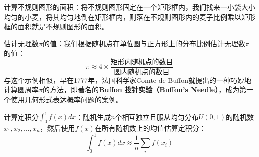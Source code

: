 \begin{example}
计算不规则图形的面积：将不规则图形固定在一个矩形框内，我们找来一小袋大小均匀的小麦，将其均匀地倒在矩形框内，则落在不规则图形内的麦子比例乘以矩形框的面积就是不规则图形的面积。
\end{example}
\begin{example}
估计无理数$\pi$的值：我们根据随机点在单位圆与正方形上的分布比例估计无理数$\pi$的值：
\[
   \pi \approx 4\times \frac{\texttt{矩形内随机点的数目}}{\texttt{圆内随机点的数目}}
\]
与这个示例相似，早在1777年，法国科学家Comte de Buffon就提出的一种巧妙地计算圆周率$\pi$的方法，即著名的\textbf{Buffon 投针实验（Buffon's Needle）}，成为第一个使用几何形式表达概率问题的案例。
\end{example}
\begin{example}
计算定积分$\int_0^1 f(x) dx$：随机生成$n$个相互独立且服从均匀分布$U(0,1)$的随机数$x_1,x_2,\ldots, x_n$，然后使用$f(x)$在所有随机数上的均值估算定积分：
\[
    \int_0^1 f(x) dx \approx \frac{1}{n} \sum\limits_i f(x_i)
\]
\end{example}

